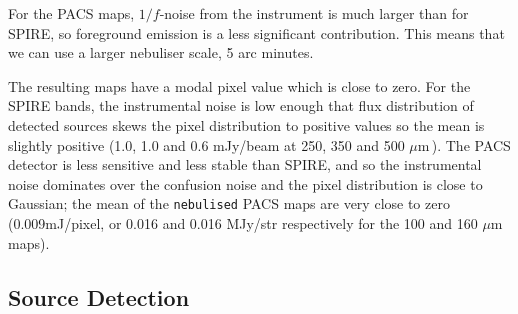 \documentclass[useAMS,usenatbib]{mn2e}
\def\mic{ $\mu $m\,}
\begin{document}
For the PACS maps, $1/f$-noise from the instrument is much larger than
for SPIRE, so foreground emission is a less significant
contribution. This means that we can use a larger nebuliser scale, 5
arc minutes.

The resulting maps have a modal pixel value which is close to
zero. For the SPIRE bands, the instrumental noise is low enough that
flux distribution of detected sources skews the pixel distribution to
positive values so the mean is slightly positive (1.0, 1.0 and 0.6
mJy/beam at 250, 350 and 500 \mic).
The PACS detector is less sensitive and less stable than SPIRE, and so the
instrumental noise dominates over the confusion noise and the pixel
distribution is close to Gaussian; the mean of the {\tt nebulised} PACS
maps are very close to zero (0.009mJ/pixel, or 0.016 and 0.016
MJy/str respectively for the 100 and 160\mic maps). 



\subsection{Source Detection} 
\end{document}
